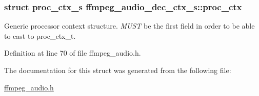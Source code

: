 \subsubsection[{\texorpdfstring{proc\+\_\+ctx}{proc_ctx}}]{\setlength{\rightskip}{0pt plus 5cm}struct {\bf proc\+\_\+ctx\+\_\+s} ffmpeg\+\_\+audio\+\_\+dec\+\_\+ctx\+\_\+s\+::proc\+\_\+ctx}\hypertarget{structffmpeg__audio__dec__ctx__s_a7d595b487c31ee5bd9b809bfb0403c5e}{}\label{structffmpeg__audio__dec__ctx__s_a7d595b487c31ee5bd9b809bfb0403c5e}
Generic processor context structure. {\itshape M\+U\+ST} be the first field in order to be able to cast to proc\+\_\+ctx\+\_\+t. 

Definition at line 70 of file ffmpeg\+\_\+audio.\+h.



The documentation for this struct was generated from the following file\+:\begin{DoxyCompactItemize}
\item 
\hyperlink{ffmpeg__audio_8h}{ffmpeg\+\_\+audio.\+h}\end{DoxyCompactItemize}
